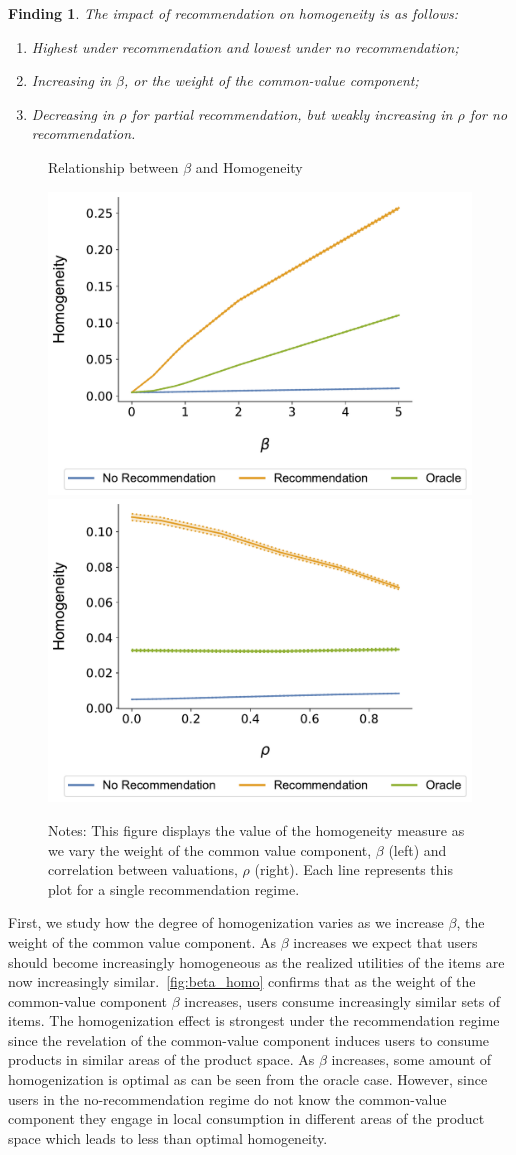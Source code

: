 \documentclass[manuscript]{acmart}
\newtheorem{finding}{Finding}
\begin{document}
\begin{finding}\label{finding_homogeneity}
The impact of recommendation on homogeneity is as follows:
\begin{enumerate}
\item Highest under recommendation and lowest under no recommendation;
\item Increasing in $\beta$, or the weight of the common-value component;
\item Decreasing in $\rho$ for partial recommendation, but weakly increasing in $\rho$ for no recommendation.
\end{enumerate}
\end{finding}

\begin{figure}[t]
\caption{Relationship between $\beta$ and Homogeneity}
\includegraphics[width=.3\linewidth]{figures/beta_homogeneity_N_200_T_20} \hspace{1.0cm}
\includegraphics[width=.3\linewidth]{figures/rho_homogeneity_N_200_T_20}\label{fig:beta_homo}
\caption*{\scriptsize Notes: This figure displays the value of the homogeneity measure as we vary the weight of the common value component, $\beta$ (left) and correlation between valuations, $\rho$ (right). Each line represents this plot for a single recommendation regime.}
\end{figure}

First, we study how the degree of homogenization varies as we increase $\beta$, the weight of the common value component. As $\beta$ increases we expect that users should become increasingly homogeneous as the realized utilities of the items are now increasingly similar.~\autoref{fig:beta_homo} confirms that as the weight of the common-value component $\beta$ increases, users consume increasingly similar sets of items. The homogenization effect is strongest under the recommendation regime since the revelation of the common-value component induces users to consume products in similar areas of the product space. As $\beta$ increases, some amount of homogenization is optimal as can be seen from the oracle case. However, since users in the no-recommendation regime do not know the common-value component they engage in local consumption in different areas of the product space which leads to less than optimal homogeneity.
\par
\end{document}
